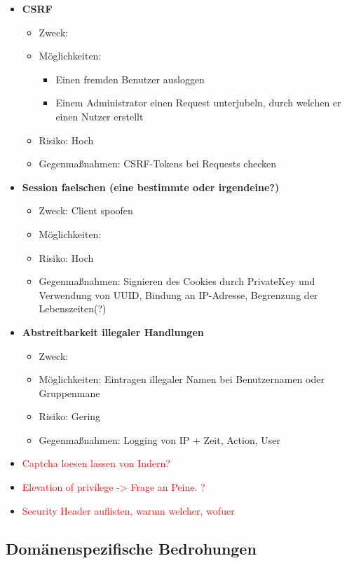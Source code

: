 \documentclass[12pt,DIV14,BCOR10mm,a4paper,twoside,parskip=half-,headsepline,headinclude,english,ngerman,bibliography=totocnumbered]{scrreprt}
\begin{document}
\begin{itemize}
  \item \textbf{CSRF}
  \begin{itemize}
  \item Zweck:
  \item Möglichkeiten:
  \begin{itemize}
          \item Einen fremden Benutzer ausloggen
          \item Einem Administrator einen Request unterjubeln, durch welchen er einen Nutzer erstellt
      \end{itemize}
  \item Risiko: Hoch
  \item Gegenmaßnahmen: CSRF-Tokens bei Requests checken
  \end{itemize}

  \item \textbf{Session faelschen (eine bestimmte oder irgendeine?)}
  \begin{itemize}
  \item Zweck: Client spoofen
  \item Möglichkeiten:
  \item Risiko: Hoch
  \item Gegenmaßnahmen: Signieren des Cookies durch PrivateKey und Verwendung von UUID, Bindung an IP-Adresse, Begrenzung der Lebenszeiten(?)
  \end{itemize}

  \item \textbf{Abstreitbarkeit illegaler Handlungen}
  \begin{itemize}
  \item Zweck:
  \item Möglichkeiten: Eintragen illegaler Namen bei Benutzernamen oder Gruppenmane
  \item Risiko: Gering
  \item Gegenmaßnahmen: Logging von IP + Zeit, Action, User
  \end{itemize}

  \item \textcolor{red}{Captcha loesen lassen von Indern?}
  \item \textcolor{red}{Elevation of privilege -> Frage an Peine. ?}
  \item \textcolor{red}{Security Header auflisten, warum welcher, wofuer}
\end{itemize}

\subsection{Domänenspezifische Bedrohungen}
\end{document}
